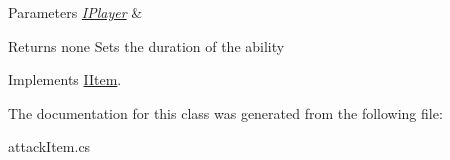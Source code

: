 \begin{DoxyParams}{Parameters}
{\em \mbox{\hyperlink{class_i_player}{I\+Player}}} & \\
\hline
\end{DoxyParams}
\begin{DoxyReturn}{Returns}
none Sets the duration of the ability 
\end{DoxyReturn}


Implements \mbox{\hyperlink{interface_i_item_a797c1d62a7828bf428cc486ceaf18e9c}{I\+Item}}.



The documentation for this class was generated from the following file\+:\begin{DoxyCompactItemize}
\item 
attack\+Item.\+cs\end{DoxyCompactItemize}
